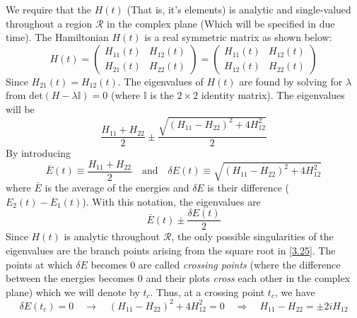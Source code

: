 \documentclass[12pt,a4paper]{article}
\begin{document}
	We require that the $H(t)$ (That is, it's elements) is analytic and single-valued throughout a region $\mathcal{R}$ in the complex plane (Which will be specified in due time). The Hamiltonian $H(t)$ is a real symmetric matrix as shown below:
	\begin{equation}
		H(t) =
		\begin{pmatrix}
			H_{11}(t) & H_{12}(t) \\
			H_{21}(t) & H_{22}(t)
		\end{pmatrix}
		=
		\begin{pmatrix}
			H_{11}(t) & H_{12}(t) \\
			H_{12}(t) & H_{22}(t)
		\end{pmatrix}
		\label{3.24}
	\end{equation}
	Since $H_{21}(t) = H_{12}(t)$.
	The eigenvalues of $H(t)$ are found by solving for $\lambda$ from \newline $\mathrm{det} \left( H - \lambda \mathbb{I} \right) = 0$ (where $\mathbb{I}$ is the $2\times 2$ identity matrix).
	The eigenvalues will be
	\begin{equation}
		\dfrac{H_{11} + H_{22}}{2} \pm \dfrac{\sqrt{\left( H_{11} - H_{22} \right)^{2} + 4H_{12}^{2}}}{2}
		\label{3.25}
	\end{equation}
	By introducing 
	\begin{equation}
		\bar{E}(t) \equiv \dfrac{H_{11} + H_{22}}{2} \quad \text{and} \quad \delta E(t) \equiv \sqrt{\left( H_{11} - H_{22} \right)^{2} + 4H_{12}^{2}}
		\label{3.26}
	\end{equation}
	where $\bar{E}$ is the average of the energies and $\delta E$ is their difference ($E_{2}(t) - E_{1}(t)$). With this notation, the eigenvalues are
	\begin{equation}
		\bar{E}(t) \pm \dfrac{\delta E(t)}{2}
	\end{equation}
	Since $H(t)$ is analytic throughout $\mathcal{R}$, the only possible singularities of the eigenvalues are the branch points arising from the square root in \eqref{3.25}. The points at which $\delta E$ becomes $0$ are called \emph{crossing points} (where the difference between the energies becomes $0$ and their plots \emph{cross} each other in the complex plane) which we will denote by $t_{c}$. Thus, at a crossing point $t_{c}$, we have
	\begin{equation}
		\delta E(t_{c}) = 0 \quad \rightarrow \quad \left( H_{11} - H_{22} \right)^{2} + 4H_{12}^{2} = 0 \quad \Rightarrow \quad H_{11} - H_{22} = \pm 2i H_{12}
		\label{3.28}
	\end{equation}
\end{document}
